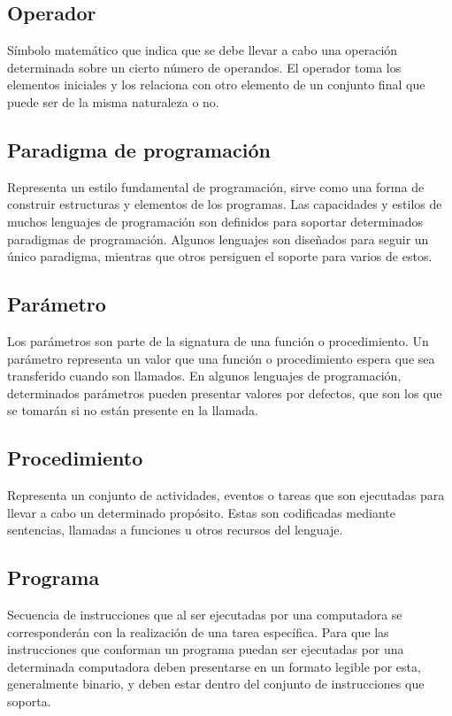 \subsection{Operador}
Símbolo matemático que indica que se debe llevar a cabo una operación determinada sobre un cierto número de operandos. 
El operador toma los elementos iniciales y los relaciona con otro elemento de un conjunto final que puede ser de la misma naturaleza o no.

\subsection {Paradigma de programación}
Representa un estilo fundamental de programación, sirve como una forma de construir estructuras y elementos de los programas. Las capacidades y estilos de muchos 
lenguajes de programación son definidos para soportar determinados paradigmas de programación. Algunos lenguajes son diseñados para seguir un único paradigma, mientras
que otros persiguen el soporte para varios de estos. 

\subsection {Parámetro}
Los parámetros son parte de la signatura de una función o procedimiento. Un parámetro representa un valor que una función o procedimiento espera que sea transferido cuando son llamados. En 
algunos lenguajes de programación, determinados parámetros pueden presentar valores por defectos, que son los que se tomarán si no están presente en la llamada.

\subsection{Procedimiento}
Representa un conjunto de actividades, eventos o tareas que son ejecutadas para llevar a cabo un determinado propósito. Estas son codificadas mediante sentencias, llamadas a funciones
u otros recursos del lenguaje. 

\subsection{Programa}
Secuencia de instrucciones que al ser ejecutadas por una computadora se corresponderán con
la realización de una tarea específica. Para que las instrucciones que conforman un programa puedan ser ejecutadas 
por una determinada computadora deben presentarse en un formato legible por esta, generalmente binario, y deben estar dentro
del conjunto de instrucciones que soporta. 

